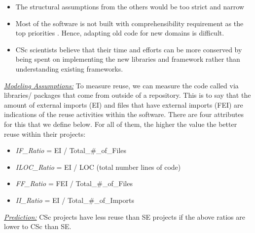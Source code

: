 \documentclass[conference,10pt]{IEEEtran}
\newcommand{\bi}{\begin{itemize}}
\newcommand{\ei}{\end{itemize}}
\begin{document}
\bi
\item The structural assumptions from the others would be too strict and narrow \cite{carver06_hpc, basili08_hpc}
\item Most of the software is not built with comprehensibility requirement as the top priorities \cite{segal07_problem}. Hence, adapting old code for new domains is difficult.
\item
CSc scientists believe that their time and efforts can be more conserved by being spent on implementing the new libraries and framework rather than understanding existing frameworks.
\ei
\noindent \textit{\underline{Modeling Assumptions:}} To
measure reuse, we can measure the  code called
via libraries/ packages that come from outside of a repository. This is to say that the amount of external imports (EI) and files that have external imports (FEI) are indications of the reuse activities within the software. There are four attributes for this that we define below. For all of them, the higher the value the better reuse within their projects: 

\bi
\item \textit{IF\_Ratio} = EI / Total\_\#\_of\_Files
\item \textit{ILOC\_Ratio} = EI / LOC (total number lines of code)
\item \textit{FF\_Ratio} = FEI / Total\_\#\_of\_Files
\item \textit{II\_Ratio} = EI / Total\_\#\_of\_Imports 
\ei


\noindent\textit{\underline{Prediction:}} CSc projects have
less reuse than SE projects if the above ratios
are lower to CSc than SE. 
\end{document}

